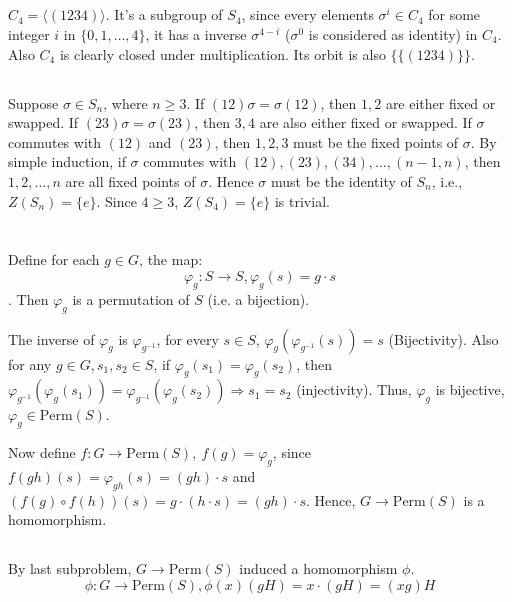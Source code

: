 \documentclass[12pt]{article}
\begin{document}
\subsection{}
$C_4=\langle (1234)\rangle$. It's a subgroup of $S_4$, since every elements $\sigma^i\in C_4$ for some integer $i$ in $\{0,1,\dots,4\}$, it has a inverse $\sigma^{4-i}$ ($\sigma^0$ is considered as identity) in $C_4$. Also $C_4$ is clearly closed under multiplication. Its orbit is also $\{\{(1234)\}\}$.
\subsection{}
Suppose $\sigma\in S_n$, where $n\ge 3$. If $(12)\sigma=\sigma(12)$, then $1,2$ are either fixed or swapped. If $(23)\sigma=\sigma(23)$, then $3,4$ are also either fixed or swapped. If $\sigma$ commutes with $(12)$ and $(23)$, then $1,2,3$ must be the fixed points of $\sigma$. By simple induction, if $\sigma$ commutes with $(12),(23),(34),\dots,(n-1,n)$, then $1,2,\dots,n$ are all fixed points of $\sigma$. Hence $\sigma$ must be the identity of $S_n$, i.e., $Z(S_n)=\{e\}$. Since $4\ge3$, $Z(S_4)=\{e\}$ is trivial.


\section{}
\subsection{}
Define for each $g\in G$, the map:
$$\varphi_g: S\rightarrow S,\varphi_g(s)=g\cdot s$$. Then $\varphi_g$ is a permutation of $S$ (i.e. a bijection).

The inverse of $\varphi_{g}$ is $\varphi_{g^{-1}}$, for every $s\in S$, $\varphi_{g}(\varphi_{g^{-1}}(s))=s$ (Bijectivity). Also for any $g\in G, s_1,s_2\in S$, if $\varphi_g(s_1)=\varphi_g(s_2)$, then $\varphi_{g^{-1}}({\varphi_g(s_1)})=\varphi_{g^{-1}}(\varphi_g(s_2))\Rightarrow s_1=s_2$ (injectivity). Thus, $\varphi_g$ is bijective, $\varphi_g\in \mathrm{Perm}(S)$. 

Now define $f:G\rightarrow \mathrm{Perm}(S),\ f(g)=\varphi_g$, since $f(gh)(s)=\varphi_{gh}(s)=(gh)\cdot s$ and $(f(g)\circ f(h))(s)=g\cdot (h\cdot s)=(gh)\cdot s$. Hence, $G\rightarrow \mathrm{Perm}(S)$ is a homomorphism.

\subsection{}
By last subproblem, $G\rightarrow\mathrm{Perm}(S)$ induced a homomorphism $\phi$.
$$\phi:G\rightarrow\mathrm{Perm}(S),\phi(x)(gH)=x\cdot(gH)=(xg)H$$
\end{document}
